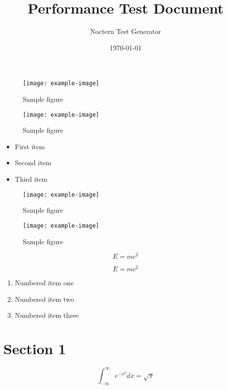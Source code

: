 \documentclass{article}
\title{Performance Test Document}
\author{Noctern Test Generator}
\date{\today}
\begin{document}
\maketitle
\tableofcontents
\newpage

\begin{figure}[h]
    \centering
    \texttt{[image: example-image]}
    \caption{Sample figure}
    \label{fig:sample}
\end{figure}

\begin{figure}[h]
    \centering
    \texttt{[image: example-image]}
    \caption{Sample figure}
    \label{fig:sample}
\end{figure}

\begin{itemize}
\item First item
\item Second item
\item Third item
\end{itemize}

\begin{figure}[h]
    \centering
    \texttt{[image: example-image]}
    \caption{Sample figure}
    \label{fig:sample}
\end{figure}

\begin{figure}[h]
    \centering
    \texttt{[image: example-image]}
    \caption{Sample figure}
    \label{fig:sample}
\end{figure}

\begin{equation}
    E = mc^2
\end{equation}

\begin{equation}
    E = mc^2
\end{equation}


\begin{enumerate}
\item Numbered item one
\item Numbered item two
\item Numbered item three
\end{enumerate}

\section{Section 1}

\begin{equation}
    \int_{-\infty}^{\infty} e^{-x^2} dx = \sqrt{\pi}
\end{equation}
\end{document}
